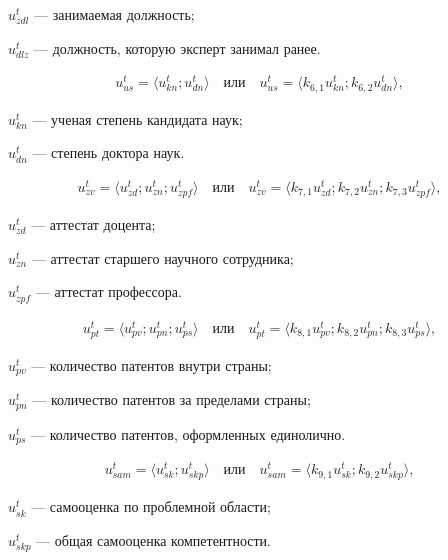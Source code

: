 \begin{description}
	\item[где] $u^t_{zdl}$ --- занимаемая должность;
	\item $u^t_{dlz}$ --- должность, которую эксперт занимал ранее.
\end{description}
\begin{align*}
	u^t_{us} = \langle u^t_{kn} ; u^t_{dn} \rangle \quad \text{или} \quad u^t_{us} = \langle k_{6,1} u^t_{kn} ; k_{6,2} u^t_{dn} \rangle,
\end{align*}
\begin{description}
	\item[где] $u^t_{kn}$ --- ученая степень кандидата наук;
	\item $u^t_{dn}$ --- степень доктора наук.
\end{description}
\begin{align*}
	u^t_{zv} = \langle u^t_{zd} ; u^t_{zn} ; u^t_{zpf} \rangle \quad \text{или} \quad u^t_{zv} = \langle k_{7,1} u^t_{zd} ; k_{7,2} u^t_{zn}  ; k_{7,3} u^t_{zpf} \rangle,
\end{align*}
\begin{description}
	\item[где] $u^t_{zd}$ --- аттестат доцента;
	\item $u^t_{zn}$ --- аттестат старшего научного сотрудника;
	\item $u^t_{zpf}$ --- аттестат профессора.
\end{description}
\begin{align*}
	u^t_{pt} = \langle u^t_{pv} ; u^t_{pn} ; u^t_{ps} \rangle \quad \text{или} \quad u^t_{pt} = \langle k_{8,1} u^t_{pv} ; k_{8,2} u^t_{pn}  ; k_{8,3} u^t_{ps} \rangle,
\end{align*}
\begin{description}
	\item[где] $u^t_{pv}$ --- количество патентов внутри страны;
	\item $u^t_{pn}$ --- количество патентов за пределами страны;
	\item $u^t_{ps}$ --- количество патентов, оформленных единолично.
\end{description}
\begin{align*}
	u^t_{sam} = \langle u^t_{sk} ; u^t_{skp} \rangle \quad \text{или} \quad u^t_{sam} = \langle k_{9,1} u^t_{sk} ; k_{9,2} u^t_{skp} \rangle,
\end{align*}
\begin{description}
	\item[где] $u^t_{sk}$ --- самооценка по проблемной области;
	\item $u^t_{skp}$ --- общая самооценка компетентности.
\end{description}
